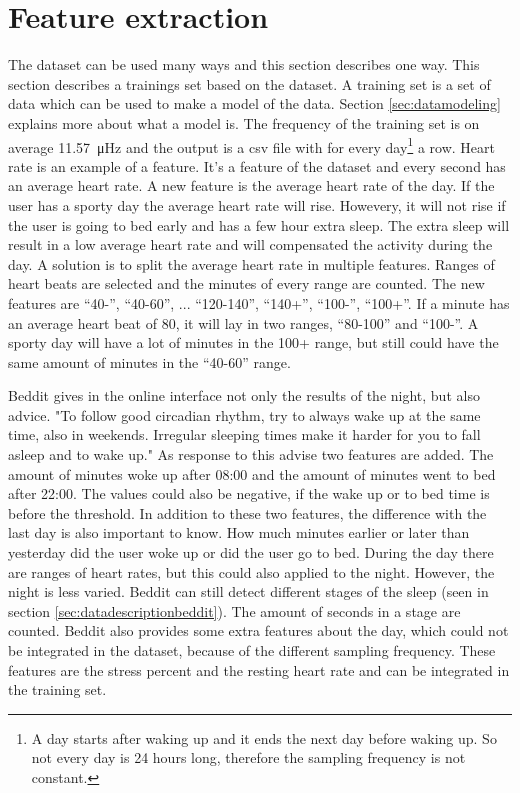 	\section{Feature extraction}
		\label{sec:feature}
				The dataset can be used many ways and this section describes one way. This section describes a trainings set based on the dataset. A training set is a set of data which can be used to make a model of the data. Section \ref{sec:datamodeling} explains more about what a model is. The frequency of the training set is on average \SI{11.57}{\micro\hertz} and the output is a csv file with for every day\footnote{A day starts after waking up and it ends the next day before waking up. So not every day is 24 hours long, therefore the sampling frequency is not constant.} a row. Heart rate is an example of a feature. It's a feature of the dataset and every second has an average heart rate. A new feature is the average heart rate of the day. If the user has a sporty day the average heart rate will rise. Howevery, it will not rise if the user is going to bed early and has a few hour extra sleep. The extra sleep will result in a low average heart rate and will compensated the activity during the day. A solution is to split the average heart rate in multiple features. Ranges of heart beats are selected and the minutes of every range are counted. The new features are ``40-'', ``40-60'', ... ``120-140'', ``140+'', ``100-'', ``100+''. If a minute has an average heart beat of 80, it will lay in two ranges, ``80-100'' and ``100-''. A sporty day will have a lot of minutes in the 100+ range, but still could have the same amount of minutes in the ``40-60'' range. 

			Beddit gives in the online interface not only the results of the night, but also advice. "To follow good circadian rhythm, try to always wake up at the same time, also in weekends. Irregular sleeping times make it harder for you to fall asleep and to wake up." As response to this advise two features are added. The amount of minutes woke up after 08:00 and the amount of minutes went to bed after 22:00. The values could also be negative, if the wake up or to bed time is before the threshold. In addition to these two features, the difference with the last day is also important to know. How much minutes earlier or later than yesterday did the user woke up or did the user go to bed. 
			During the day there are ranges of heart rates, but this could also applied to the night. However, the night is less varied. Beddit can still detect different stages of the sleep (seen in section \ref{sec:datadescriptionbeddit}). The amount of seconds in a stage are counted.
			 Beddit also provides some extra features about the day, which could not be integrated in the dataset, because of the different sampling frequency. These features are the stress percent and the resting heart rate and can be integrated in the training set.
				
